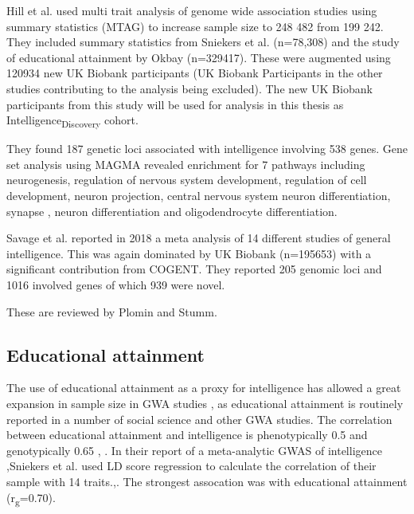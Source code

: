 Hill et al. \cite{hill2019combined} used multi trait analysis of genome wide association studies using summary statistics (MTAG)\cite{turley2018multi} to increase sample size to 248 482 from 199 242. They included summary statistics from Sniekers et al.  (n=78,308)\cite{sniekers2017genome} and the study of educational attainment by Okbay (n=329417)\cite{okbay2016genome}. These were augmented using 120934 new UK Biobank participants (UK Biobank Participants in the other studies contributing to the analysis being excluded). The new UK Biobank participants from this study will be used for analysis in this thesis as Intelligence\textsubscript{Discovery} cohort. 

They found 187 genetic loci associated with intelligence involving 538 genes. Gene set analysis using MAGMA revealed enrichment for 7 pathways including  neurogenesis, regulation of nervous system development, regulation of cell development, neuron projection, central nervous system neuron differentiation, synapse , neuron differentiation and oligodendrocyte differentiation. 

Savage et al. \cite{savage2018genome} reported in 2018 a meta analysis of 14 different studies of general intelligence. This was again dominated by UK Biobank (n=195653) with a significant contribution from COGENT. They reported 205 genomic loci and 1016 involved genes of which 939 were novel. 

These are reviewed by Plomin and Stumm\cite{plomin2018new}.

\subsection{Educational attainment}
\label{sec:Intro Educational Attainment}

The use of educational attainment as a proxy for intelligence has allowed a great expansion in sample size in GWA studies \cite{plomin2018new}, as educational attainment is routinely reported in a number of social science and other GWA studies. The correlation between educational attainment and intelligence is phenotypically 0.5 and genotypically 0.65 \cite{plomin2018new}, \cite{rietveld2014common}. In their report of a meta-analytic GWAS of intelligence ,Sniekers et al. used LD score regression to calculate the correlation of their sample with 14 traits.\cite{sniekers2017genome},\cite{bulik2015ld}. The strongest assocation was with educational attainment (r\textsubscript{g}=0.70).

